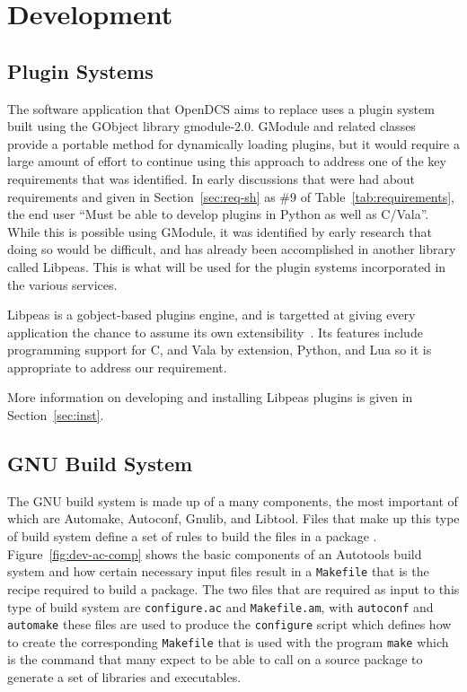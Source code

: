 \section{Development}\label{sec:dev}

  \subsection{Plugin Systems}\label{sec:dev-plugins}

    The software application that OpenDCS aims to replace uses a plugin system
    built using the GObject library gmodule-2.0. GModule and related classes
    provide a portable method for dynamically loading plugins, but it would
    require a large amount of effort to continue using this approach to address
    one of the key requirements that was identified. In early discussions that
    were had about requirements and given in Section~\ref{sec:req-sh} as \#9 of
    Table~\ref{tab:requirements}, the end user ``Must be able to develop plugins
    in Python as well as C/Vala''. While this is possible using GModule, it was
    identified by early research that doing so would be difficult, and has
    already been accomplished in another library called Libpeas. This is what
    will be used for the plugin systems incorporated in the various services.

    Libpeas is a gobject-based plugins engine, and is targetted at giving every
    application the chance to assume its own extensibility~\cite{Libpeas2016}.
    Its features include programming support for C, and Vala by extension,
    Python, and Lua so it is appropriate to address our requirement.

    More information on developing and installing Libpeas plugins is given in
    Section~\ref{sec:inst}.

  \subsection{GNU Build System}\label{sec:dev-ac}

    The GNU build system is made up of a many components, the most important of
    which are Automake, Autoconf, Gnulib, and Libtool. Files that make up this
    type of build system define a set of rules to build the files in a package
    \cite{Automake2014}. Figure~\ref{fig:dev-ac-comp} shows the basic components
    of an Autotools build system and how certain necessary input files result in
    a \texttt{Makefile} that is the recipe required to build a package. The two
    files that are required as input to this type of build system are
    \texttt{configure.ac} and \texttt{Makefile.am}, with \texttt{autoconf} and
    \texttt{automake} these files are used to produce the \texttt{configure}
    script which defines how to create the corresponding \texttt{Makefile} that
    is used with the program \texttt{make} which is the command that many expect
    to be able to call on a source package to generate a set of libraries and
    executables.

